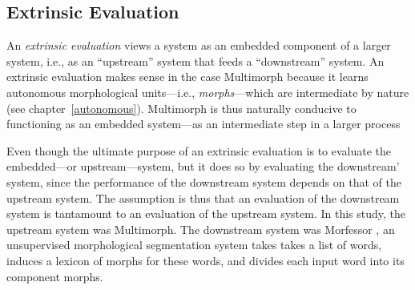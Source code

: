 \subsection{Extrinsic Evaluation} \label{sec:eval-extrinsic} An \emph{extrinsic evaluation} 
views a system as an embedded component of a larger system, i.e., as an ``upstream'' system that feeds a ``downstream''
system. An extrinsic evaluation makes sense in the case Multimorph because it learns autonomous morphological units---i.e., \emph{morphs}---which are intermediate by nature (see chapter~\ref{autonomous}).
Multimorph is thus naturally conducive to functioning as an embedded system---as an intermediate step in a larger process

Even though the ultimate purpose of an extrinsic evaluation is to evaluate the embedded---or upstream---system,
 but it does so by evaluating the downstream' system, since the
 performance of the downstream system depends on that of the upstream system. 
 The assumption is thus that an evaluation of the downstream system is tantamount to an evaluation of the upstream system.
In this study, the upstream system was Multimorph. The downstream system was
 Morfessor
\citep{creutz:2003, creutz-and-lagus:2005, creutz-et-al:2006, creutz-and-lagus:2007}, an 
unsupervised morphological segmentation 
system takes takes a list of words, induces a lexicon of morphs 
for these words, and divides each input word into its component morphs. %
